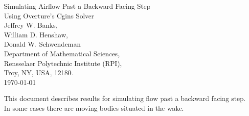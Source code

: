 \documentclass[11pt]{article}
\begin{document}


\def\comma  {~~~,~~}
\newcommand{\uvd}{\mathbf{U}}
\def\ud     {{    U}}
\def\pd     {{    P}}
\def\calo{{\cal O}}

\newcommand{\mbar}{\bar{m}}
\newcommand{\Rbar}{\bar{R}}
\newcommand{\Ru}{R_u}         %
\newcommand{\Div}{\grad\cdot}
\newcommand{\tauv}{\boldsymbol{\tau}}
\newcommand{\thetav}{\boldsymbol{\theta}}

\newcommand{\Omegav}{\boldsymbol{\Omega}}
\newcommand{\omegav}{\boldsymbol{\omega}}
\newcommand{\sigmav}{\boldsymbol{\sigma}}
\newcommand{\cm}{{\rm cm}}

\newcommand{\ds}{\Delta s}
\newcommand{\dsbl}{\ds_{\rm bl}}


\newcommand{\sumi}{\sum_{i=1}^n}
\newcommand{\dt}{{\Delta t}}

\def\ff {\tt} %


\newcommand{\Bc}{{\mathcal B}}
\newcommand{\Dc}{{\mathcal D}}
\newcommand{\Ec}{{\mathcal E}}
\newcommand{\Fc}{{\mathcal F}}
\newcommand{\Gc}{{\mathcal G}}
\newcommand{\Hc}{{\mathcal H}}
\newcommand{\Ic}{{\mathcal I}}
\newcommand{\Jc}{{\mathcal J}}
\newcommand{\Lc}{{\mathcal L}}
\newcommand{\Nc}{{\mathcal N}}
\newcommand{\Pc}{{\mathcal P}}
\newcommand{\Rc}{{\mathcal R}}
\newcommand{\Sc}{{\mathcal S}}

\newcommand{\bogus}[1]{}  %

\vspace{5\baselineskip}
\begin{flushleft}
{\LARGE
Simulating Airflow Past a Backward Facing Step \\
Using Overture's Cgins Solver\\
}
\vspace{2\baselineskip}
Jeffrey W. Banks,  \\
William D. Henshaw, \\
Donald W. Schwendeman \\
% 
\vspace{2\baselineskip}
% 
Department of Mathematical Sciences, \\
Rensselaer Polytechnic Institute (RPI), \\
Troy, NY, USA, 12180. \\
\vspace{\baselineskip}
\today\\

\vspace{4\baselineskip}


This document describes results for simulating flow past a backward facing step.
In some cases there are moving bodies situated in the wake.

\end{flushleft}
\end{document}
